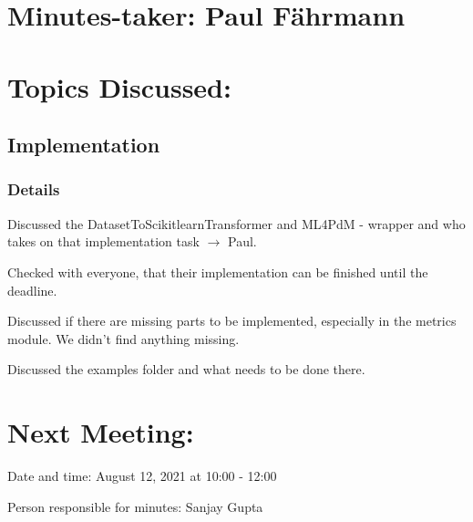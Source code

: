 \documentclass[11pt]{meetingmins} %
\begin{document}
\maketitle

\section{Minutes-taker: Paul Fährmann}

\section{Topics Discussed:}

\subsection{Implementation}
\subsubsection{Details}
\begin{hiddensubitems}
	\item Discussed the DatasetToScikitlearnTransformer and ML4PdM - wrapper and who takes on that implementation task $\rightarrow$ Paul.
    \item Checked with everyone, that their implementation can be finished until the deadline.
    \item Discussed if there are missing parts to be implemented, especially in the metrics module. We didn't find anything missing.
    \item Discussed the examples folder and what needs to be done there.
\end{hiddensubitems}

\section{Next Meeting:}
\begin{hiddensubitems}
    \item Date and time: August 12, 2021 at 10:00 - 12:00
    \item Person responsible for minutes: Sanjay Gupta
\end{hiddensubitems}
\end{document}
